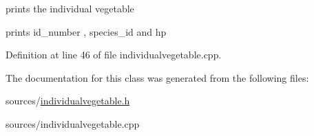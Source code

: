 prints the individual vegetable 

prints id\_\-number , species\_\-id and hp 

Definition at line 46 of file individualvegetable.cpp.



The documentation for this class was generated from the following files:\begin{DoxyCompactItemize}
\item 
sources/\hyperlink{individualvegetable_8h}{individualvegetable.h}\item 
sources/individualvegetable.cpp\end{DoxyCompactItemize}
